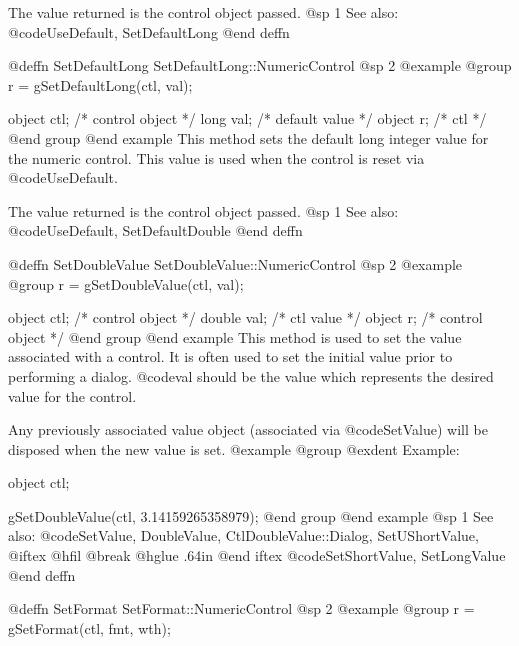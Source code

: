 The value returned is the control object passed.
@sp 1
See also:  @code{UseDefault, SetDefaultLong}
@end deffn



@deffn {SetDefaultLong} SetDefaultLong::NumericControl
@sp 2
@example
@group
r = gSetDefaultLong(ctl, val);

object  ctl;   /*  control object   */
long    val;   /*  default value    */
object  r;     /*  ctl              */
@end group
@end example
This method sets the default long integer value for the numeric control.
This value is used when the control is reset via @code{UseDefault}.

The value returned is the control object passed.
@sp 1
See also:  @code{UseDefault, SetDefaultDouble}
@end deffn














@deffn {SetDoubleValue} SetDoubleValue::NumericControl
@sp 2
@example
@group
r = gSetDoubleValue(ctl, val);

object  ctl;    /*  control object  */
double  val;    /*  ctl value       */
object  r;      /*  control object  */
@end group
@end example
This method is used to set the value associated with a control.  It is
often used to set the initial value prior to performing a dialog.
@code{val} should be the value which represents the desired value for
the control.

Any previously associated value object (associated via @code{SetValue})
will be disposed when the new value is set.
@example
@group
@exdent Example:

object  ctl;

gSetDoubleValue(ctl, 3.14159265358979);
@end group
@end example
@sp 1
See also:  @code{SetValue, DoubleValue, CtlDoubleValue::Dialog, SetUShortValue,}
@iftex
@hfil @break @hglue .64in   
@end iftex
@code{SetShortValue, SetLongValue}
@end deffn



@deffn {SetFormat} SetFormat::NumericControl
@sp 2
@example
@group
r = gSetFormat(ctl, fmt, wth);

